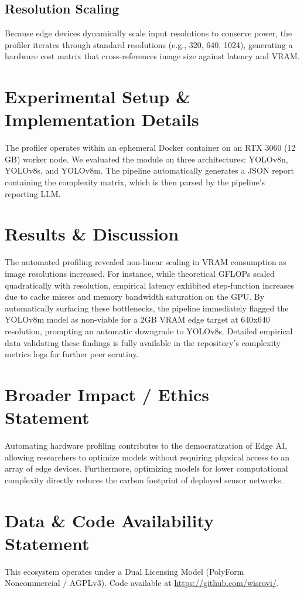 \documentclass[conference]{IEEEtran}
\begin{document}
\subsection{Resolution Scaling}
Because edge devices dynamically scale input resolutions to conserve power, the profiler iterates through standard resolutions (e.g., 320, 640, 1024), generating a hardware cost matrix that cross-references image size against latency and VRAM.

\section{Experimental Setup \& Implementation Details}
The profiler operates within an ephemeral Docker container on an RTX 3060 (12\,GB) worker node. We evaluated the module on three architectures: YOLOv8n, YOLOv8s, and YOLOv8m. The pipeline automatically generates a JSON report containing the complexity matrix, which is then parsed by the pipeline's reporting LLM.

\section{Results \& Discussion}
The automated profiling revealed non-linear scaling in VRAM consumption as image resolutions increased. For instance, while theoretical GFLOPs scaled quadratically with resolution, empirical latency exhibited step-function increases due to cache misses and memory bandwidth saturation on the GPU. By automatically surfacing these bottlenecks, the pipeline immediately flagged the YOLOv8m model as non-viable for a 2GB VRAM edge target at 640x640 resolution, prompting an automatic downgrade to YOLOv8s. Detailed empirical data validating these findings is fully available in the repository's complexity metrics logs for further peer scrutiny.

\section{Broader Impact / Ethics Statement}
Automating hardware profiling contributes to the democratization of Edge AI, allowing researchers to optimize models without requiring physical access to an array of edge devices. Furthermore, optimizing models for lower computational complexity directly reduces the carbon footprint of deployed sensor networks.

\section{Data \& Code Availability Statement}
This ecosystem operates under a Dual Licensing Model (PolyForm Noncommercial / AGPLv3). 
Code available at \url{https://github.com/wisrovi/}.
\end{document}
